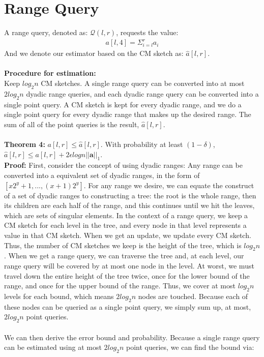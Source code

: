 \documentclass[11pt]{article}
\begin{document}
\section{Range Query}
A range query, denoted as: $\mathcal{Q}(l,r)$, requests the value:
\begin{align*}
    a[l,4] = \Sigma_{i=l}^r a_i
\end{align*}
And we denote our estimator based on the CM sketch as: $\hat a[l,r]$.\\\\
    \textbf{Procedure for estimation:}\\
    Keep $log_2n$ CM sketches. A single range query can be converted into at most $2log_2n$ dyadic range queries, and each dyadic range query can be converted into a single point query. A CM sketch is kept for every dyadic range, and we do a single point query for every dyadic range that makes up the desired range. The sum of all of the point queries is the result, $\hat a[l,r]$.\\\\
    \textbf{Theorem 4: } $a[l,r] \leq \hat a[l,r]$. With probability at least $(1-\delta)$, $\hat a[l,r] \leq a[l,r] + 2\epsilon logn ||\bm{a}||_1$.\\ 
    \textbf{Proof:} First, consider the concept of using dyadic ranges: Any range can be converted into a equivalent set of dyadic ranges, in the form of $[x2^y+1, ... , (x+1)2^y]$. For any range we desire, we can equate the construct of a set of dyadic ranges to constructing a tree: the root is the whole range, then its children are each half of the range, and this continues until we hit the leaves, which are sets of singular elements. In the context of a range query, we keep a CM sketch for each level in the tree, and every node in that level represents a value in that CM sketch. When we get an update, we update every CM sketch. Thus, the number of CM sketches we keep is the height of the tree, which is $log_2n$. When we get a range query, we can traverse the tree and, at each level, our range query will be covered by at most one node in the level. At worst, we must travel down the entire height of the tree twice, once for the lower bound of the range, and once for the upper bound of the range. Thus, we cover at most $log_2n$ levels for each bound, which means $2log_2n$ nodes are touched. Because each of these nodes can be queried as a single point query, we simply sum up, at most, $2log_2n$ point queries. \\\\
    We can then derive the error bound and probability. Because a single range query can be estimated using at most $2log_2n$ point queries, we can find the bound via:
\end{document}
